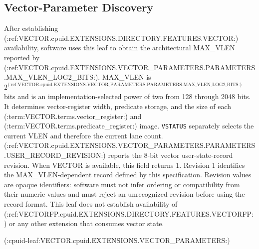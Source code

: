 \subsection{Vector-Parameter Discovery}
After establishing (:ref:VECTOR.cpuid.EXTENSIONS.DIRECTORY.FEATURES.VECTOR:) availability, software uses this leaf to obtain the architectural MAX\_VLEN reported by (:ref:VECTOR.cpuid.EXTENSIONS.VECTOR_PARAMETERS.PARAMETERS.MAX_VLEN_LOG2_BITS:). MAX\_VLEN is
$2^{\text{(:ref:VECTOR.cpuid.EXTENSIONS.VECTOR_PARAMETERS.PARAMETERS.MAX_VLEN_LOG2_BITS:)}}$ bits and is an implementation-selected power of two from 128 through 2048 bits.
It determines vector-register width, predicate storage, and the size of each
(:term:VECTOR.terms.vector_register:) and
(:term:VECTOR.terms.predicate_register:) image. \texttt{VSTATUS} separately
selects the current VLEN and therefore the current lane count.
(:ref:VECTOR.cpuid.EXTENSIONS.VECTOR_PARAMETERS.PARAMETERS.USER_RECORD_REVISION:) reports the 8-bit vector user-state-record revision. When VECTOR is available, this field returns 1. Revision 1 identifies the MAX\_VLEN-dependent record defined by this specification. Revision values are opaque identifiers: software must not infer ordering or compatibility from their numeric values and must reject an unrecognized revision before using the record format. This leaf does not
establish availability of (:ref:VECTORFP.cpuid.EXTENSIONS.DIRECTORY.FEATURES.VECTORFP:) or any other extension that consumes vector state.

(:cpuid-leaf:VECTOR.cpuid.EXTENSIONS.VECTOR_PARAMETERS:)
